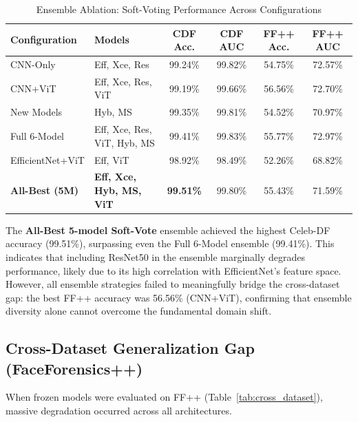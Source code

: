 \documentclass[runningheads]{llncs}
\begin{document}
\begin{table}[H]
\caption{Ensemble Ablation: Soft-Voting Performance Across Configurations}
\label{tab:ensemble}
\centering
\small
\setlength{\tabcolsep}{4pt}
\begin{tabular}{llcccc}
\toprule
\textbf{Configuration} & \textbf{Models} & \textbf{CDF Acc.} & \textbf{CDF AUC} & \textbf{FF++ Acc.} & \textbf{FF++ AUC} \\
\midrule
CNN-Only        & Eff, Xce, Res               & 99.24\% & 99.82\% & 54.75\% & 72.57\% \\
CNN+ViT         & Eff, Xce, Res, ViT          & 99.19\% & 99.66\% & 56.56\% & 72.70\% \\
New Models      & Hyb, MS                     & 99.35\% & 99.81\% & 54.52\% & 70.97\% \\
Full 6-Model    & Eff, Xce, Res, ViT, Hyb, MS & 99.41\% & 99.83\% & 55.77\% & 72.97\% \\
EfficientNet+ViT & Eff, ViT                   & 98.92\% & 98.49\% & 52.26\% & 68.82\% \\
\textbf{All-Best (5M)} & \textbf{Eff, Xce, Hyb, MS, ViT}  & \textbf{99.51\%} & 99.80\% & 55.43\% & 71.59\% \\
\bottomrule
\end{tabular}
\end{table}

The \textbf{All-Best 5-model Soft-Vote} ensemble achieved the highest Celeb-DF accuracy (99.51\%), surpassing even the Full 6-Model ensemble (99.41\%). This indicates that including ResNet50 in the ensemble marginally degrades performance, likely due to its high correlation with EfficientNet's feature space. However, all ensemble strategies failed to meaningfully bridge the cross-dataset gap: the best FF++ accuracy was 56.56\% (CNN+ViT), confirming that ensemble diversity alone cannot overcome the fundamental domain shift.

\subsection{Cross-Dataset Generalization Gap (FaceForensics++)}
When frozen models were evaluated on FF++ (Table~\ref{tab:cross_dataset}), massive degradation occurred across all architectures.
\end{document}
